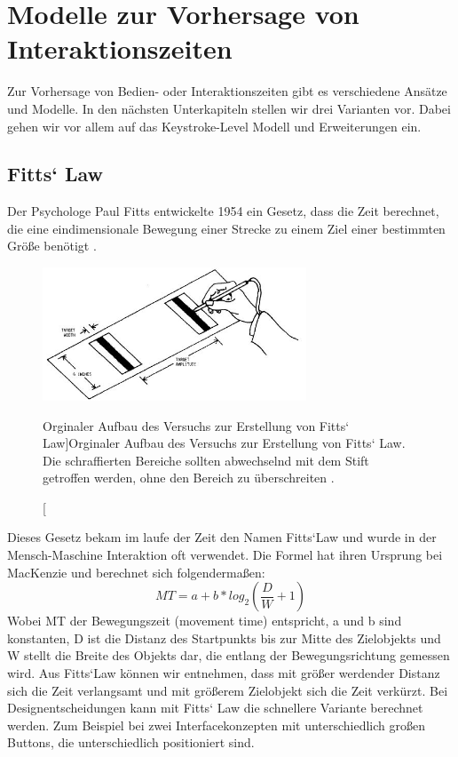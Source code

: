 \section[Vorhersagemodelle]{Modelle zur Vorhersage von Interaktionszeiten}
Zur Vorhersage von Bedien- oder Interaktionszeiten gibt es verschiedene Ansätze und Modelle. 
In den nächsten Unterkapiteln stellen wir drei Varianten vor. 
Dabei gehen wir vor allem auf das Keystroke-Level Modell und Erweiterungen ein. 
\subsection[Fitts` Law]{Fitts` Law}
Der Psychologe Paul Fitts entwickelte 1954 ein Gesetz, dass die Zeit berechnet, die eine eindimensionale Bewegung einer Strecke zu einem Ziel einer bestimmten Größe benötigt \citep{fitts1954information}. 
\begin{figure}
	\centering
		\includegraphics[width=0.7\textwidth]{img/FittsLaw.JPG}
	\caption[Orginaler Aufbau des Versuchs zur Erstellung von Fitts` Law]{Orginaler Aufbau des Versuchs zur Erstellung von Fitts` Law. 
	Die schraffierten Bereiche sollten abwechselnd mit dem Stift getroffen werden, ohne den Bereich zu überschreiten \citep{fitts1954information}. }
	\label{fig:FittsLaw}
\end{figure}

Dieses Gesetz bekam im laufe der Zeit den Namen Fitts`Law und wurde in der Mensch-Maschine Interaktion oft verwendet. 
Die Formel hat ihren Ursprung bei MacKenzie \citep{MacKenzie:1992} und berechnet sich folgendermaßen:
\[
MT= a+b * log_2 (\frac{D}{W}+1)
\]
Wobei MT der Bewegungszeit (movement time) entspricht, a und b sind konstanten, D ist die Distanz des Startpunkts bis zur Mitte des Zielobjekts und W stellt die Breite des Objekts dar, die entlang der Bewegungsrichtung gemessen wird. 
Aus Fitts`Law können wir entnehmen, dass mit größer werdender Distanz sich die Zeit verlangsamt und mit größerem Zielobjekt sich die Zeit verkürzt. 
Bei Designentscheidungen kann mit Fitts` Law die schnellere Variante berechnet werden. 
Zum Beispiel bei zwei Interfacekonzepten mit unterschiedlich großen Buttons, die unterschiedlich positioniert sind. 

